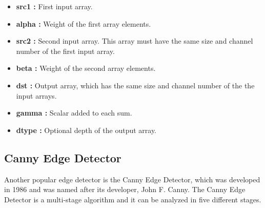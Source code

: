     \begin{itemize}

\item \textbf{src1 : }First input array.

\item \textbf{alpha : }Weight of the first array elements.

\item \textbf{src2 : }Second input array. This array must have the same size and channel number of the first input array.

\item \textbf{beta : }Weight of the second array elements.

\item \textbf{dst : }Output array, which has the same size and channel number of the the input arrays.

\item \textbf{gamma : }Scalar added to each sum.

\item \textbf{dtype : }Optional depth of the output array.

 \end{itemize}






 
%
\subsection{Canny Edge Detector}\label{sec:Canny Edge Detector}

Another popular edge detector is the Canny Edge Detector, which was developed in 1986 and was named after its developer, John F. Canny. The Canny Edge Detector is a multi-stage algorithm and it can be analyzed in five different stages.\cite{Canny_Edge_Detector2}

